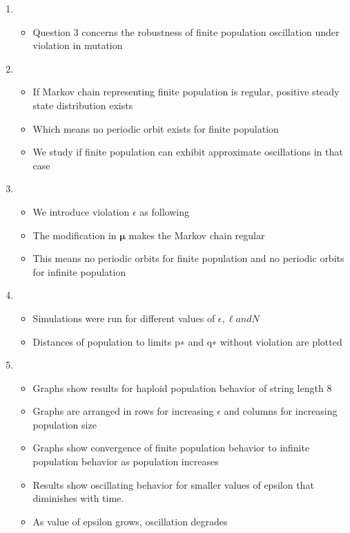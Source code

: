 \documentclass{article}
\begin{document}
\begin{enumerate}
\item
  \begin{itemize}
  \item Question 3 concerns the robustness of finite population oscillation under violation in mutation
  
  \end{itemize}

\item
  \begin{itemize}
  \item If Markov chain representing finite population is regular, positive steady state distribution exists 
  \item Which means no periodic orbit exists for finite population
  \item We study if finite population can exhibit approximate oscillations in that case  
  
  \end{itemize}
  
\item
  \begin{itemize}
  \item We introduce violation $\epsilon$ as following
  \item The modification in $\bm{\mu}$ makes the Markov chain regular
  \item This means no periodic orbits for finite population and no periodic orbits for infinite population
  
  \end{itemize}
  
\item
  \begin{itemize}
  \item Simulations were run for different values of $\epsilon, \ell and N$
  \item Distances of population to limits p∗ and q∗ without violation are plotted  
  \end{itemize}
  
\item
  \begin{itemize}
  \item Graphs show results for haploid population behavior of string length 8
  \item Graphs are arranged in rows for increasing $\epsilon$ and columns for increasing population size
  \item Graphs show convergence of finite population behavior to infinite population behavior as population increases
  \item Results show oscillating behavior for smaller values of epsilon that diminishes with time.
  \item As value of epsilon grows, oscillation degrades
  

\end{itemize}
\end{enumerate}
\end{document}

